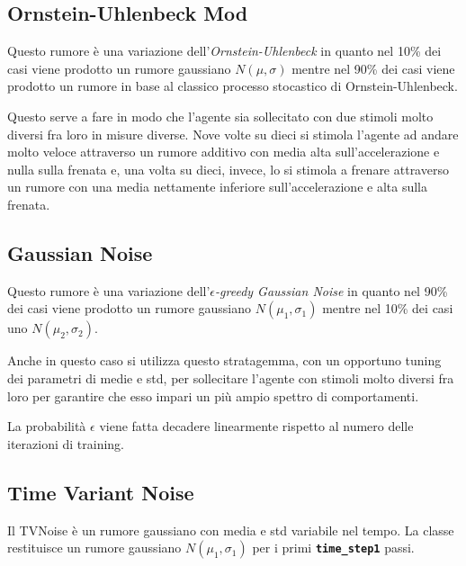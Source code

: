 \clearpage

\subsection{Ornstein-Uhlenbeck Mod}

Questo rumore è una variazione dell'\textit{Ornstein-Uhlenbeck} in quanto nel 10\% dei casi viene prodotto un rumore gaussiano $N(\mu,\sigma)$ mentre nel 90\% dei casi viene prodotto un rumore in base al classico processo stocastico di Ornstein-Uhlenbeck.
\newline

Questo serve a fare in modo che l'agente sia sollecitato con due stimoli molto diversi fra loro in misure diverse. Nove volte su dieci si stimola l'agente ad andare molto veloce attraverso un rumore additivo con media alta sull'accelerazione e nulla sulla frenata e, una volta su dieci, invece, lo si stimola a frenare attraverso un rumore con una media nettamente inferiore sull'accelerazione e alta sulla frenata.

\subsection{Gaussian Noise}

Questo rumore è una variazione dell'\textit{$\epsilon$-greedy Gaussian Noise} in quanto nel 90\% dei casi viene prodotto un rumore gaussiano $N(\mu_1,\sigma_1)$ mentre nel 10\% dei casi uno $N(\mu_2,\sigma_2)$. 
\newline

Anche in questo caso si utilizza questo stratagemma, con un opportuno tuning dei parametri di medie e std, per sollecitare l'agente con stimoli molto diversi fra loro per garantire che esso impari un più ampio spettro di comportamenti.
\newline

La probabilità $\epsilon$ viene fatta decadere linearmente rispetto al numero delle iterazioni di training.

\clearpage

\subsection{Time Variant Noise}

Il TVNoise è un rumore gaussiano con media e std variabile nel tempo.
La classe restituisce un rumore gaussiano $N(\mu_1,\sigma_1)$ per i primi \textbf{\texttt{time\_step1}} passi.
\newline

